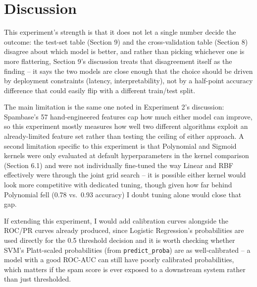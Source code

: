 \documentclass[11pt,a4paper]{article}
\begin{document}
\section{Discussion}
This experiment's strength is that it does not let a single number decide the outcome: the test-set table (Section 9) and the cross-validation table (Section 8) disagree about which model is better, and rather than picking whichever one is more flattering, Section 9's discussion treats that disagreement itself as the finding -- it says the two models are close enough that the choice should be driven by deployment constraints (latency, interpretability), not by a half-point accuracy difference that could easily flip with a different train/test split.

The main limitation is the same one noted in Experiment 2's discussion: Spambase's 57 hand-engineered features cap how much either model can improve, so this experiment mostly measures how well two different algorithms exploit an already-limited feature set rather than testing the ceiling of either approach. A second limitation specific to this experiment is that Polynomial and Sigmoid kernels were only evaluated at default hyperparameters in the kernel comparison (Section 6.1) and were not individually fine-tuned the way Linear and RBF effectively were through the joint grid search -- it is possible either kernel would look more competitive with dedicated tuning, though given how far behind Polynomial fell (0.78 vs.\ 0.93 accuracy) I doubt tuning alone would close that gap.

If extending this experiment, I would add calibration curves alongside the ROC/PR curves already produced, since Logistic Regression's probabilities are used directly for the 0.5 threshold decision and it is worth checking whether SVM's Platt-scaled probabilities (from \texttt{predict\_proba}) are as well-calibrated -- a model with a good ROC-AUC can still have poorly calibrated probabilities, which matters if the spam score is ever exposed to a downstream system rather than just thresholded.

\end{document}
